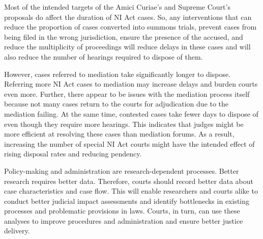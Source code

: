 \documentclass[12pt,a4paper]{article}
\begin{document}
Most of the intended targets of the Amici Curiae’s and Supreme Court’s proposals do affect the duration of NI Act cases. So, any interventions that can reduce the proportion of cases converted into summons trials, prevent cases from being filed in the wrong jurisdiction, ensure the presence of the accused, and reduce the multiplicity of proceedings will reduce delays in these cases and will also reduce the number of hearings required to dispose of them.

However, cases referred to mediation take significantly longer to dispose. Referring more NI Act cases to mediation may increase delays and burden courts even more. Further, there appear to be issues with the mediation process itself because not many cases return to the courts for adjudication due to the mediation failing. At the same time, contested cases take fewer days to dispose of even though they require more hearings. This indicates that judges might be more efficient at resolving these cases than mediation forums. As a result, increasing the number of special NI Act courts might have the intended effect of rising disposal rates and reducing pendency.

Policy-making and administration are research-dependent processes. Better research requires better data. Therefore, courts should record better data about case characteristics and case flow. This will enable researchers and courts alike to conduct better judicial impact assessments and identify bottlenecks in existing processes and problematic provisions in laws. Courts, in turn, can use these analyses to improve procedures and administration and ensure better justice delivery.
\end{document}
